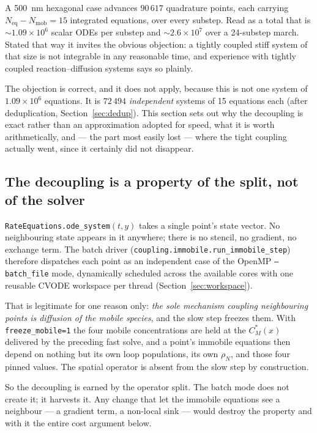 \documentclass[11pt,a4paper]{article}
\newcommand{\code}[1]{\texttt{\small #1}}
\begin{document}
A 500~nm hexagonal case advances $90\,617$ quadrature points, each carrying
$N_{\mathrm{eq}}-N_{\mathrm{mob}} = 15$ integrated equations, over every
substep. Read as a total that is $\sim\!1.09\times10^{6}$ scalar ODEs per
substep and $\sim\!2.6\times10^{7}$ over a 24-substep march. Stated that way it
invites the obvious objection: a tightly coupled stiff system of that size is
not integrable in any reasonable time, and experience with tightly coupled
reaction--diffusion systems says so plainly.

The objection is correct, and it does not apply, because this is not one system
of $1.09\times10^{6}$ equations. It is $72\,494$ \emph{independent} systems of
15 equations each (after deduplication, Section~\ref{sec:dedup}). This section
sets out why the decoupling is exact rather than an approximation adopted for
speed, what it is worth arithmetically, and --- the part most easily lost ---
where the tight coupling actually went, since it certainly did not disappear.

\subsection{The decoupling is a property of the split, not of the solver}

\code{RateEquations.ode\_system}$(t, y)$ takes a single point's state vector.
No neighbouring state appears in it anywhere; there is no stencil, no gradient,
no exchange term. The batch driver
(\code{coupling.immobile.run\_immobile\_step}) therefore dispatches each point
as an independent case of the OpenMP \code{--batch\_file} mode, dynamically
scheduled across the available cores with one reusable CVODE workspace per
thread (Section~\ref{sec:workspace}).

That is legitimate for one reason only: \emph{the sole mechanism coupling
neighbouring points is diffusion of the mobile species}, and the slow step
freezes them. With \code{freeze\_mobile=1} the four mobile concentrations are
held at the $C_M^*(x)$ delivered by the preceding fast solve, and a point's
immobile equations then depend on nothing but its own loop populations, its own
$\rho_N$, and those four pinned values. The spatial operator is absent from the
slow step by construction.

So the decoupling is earned by the operator split. The batch mode does not
create it; it harvests it. Any change that let the immobile equations see a
neighbour --- a gradient term, a non-local sink --- would destroy the property
and with it the entire cost argument below.
\end{document}
